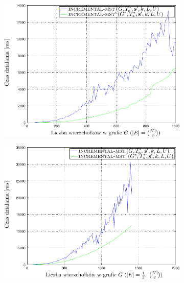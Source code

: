 \begin{figure}[!htbp]
	\null\hfill
	\begin{subfigure}[b]{0.32\textwidth}
		\includegraphics[width=\textwidth]{Chapter_VI/IMST1-example/IMST1_psfrag}
		\caption{}
		\label{fig:a:a}
	\end{subfigure}
	\hfill
	\begin{subfigure}[b]{0.32\textwidth}
		\includegraphics[width=\textwidth]{Chapter_VI/IMST2-example/IMST2_psfrag}
		\caption{}
		\label{fig:a:b}
	\end{subfigure}
	\hfill
	\begin{subfigure}[b]{0.32\textwidth}

\end{subfigure}
\end{figure}
